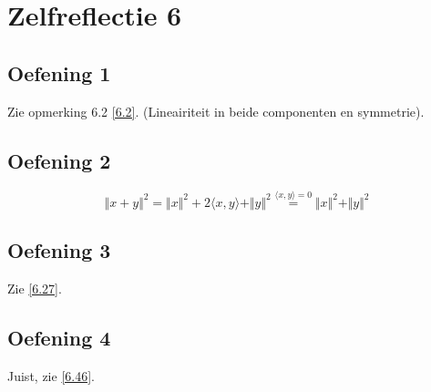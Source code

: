 \documentclass[lineaire_algebra_oplossingen.tex]{subfiles}
\begin{document}
\section{Zelfreflectie 6}
\subsection{Oefening 1}
Zie opmerking 6.2 \ref{6.2}. (Lineairiteit in beide componenten en symmetrie).

\subsection{Oefening 2}
\[
\Vert x+y \Vert^2 = \Vert x\Vert^2 + 2\langle x,y \rangle+ \Vert y\Vert^2 \overset{\langle x,y \rangle = 0}{=}\Vert x\Vert^2 + \Vert y\Vert^2
\]

\subsection{Oefening 3}
Zie \ref{6.27}.

\subsection{Oefening 4}
Juist, zie \ref{6.46}.
\end{document}
